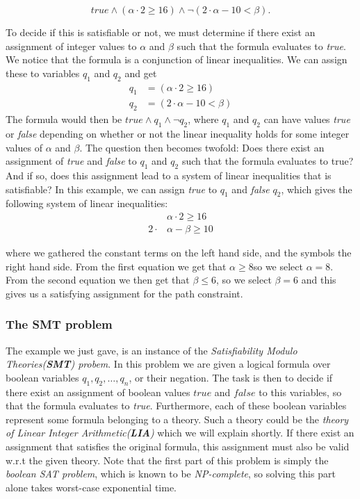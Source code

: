 	\begin{equation}	
		true \land (\alpha \cdot 2 \geq 16) \land \neg (2\cdot \alpha - 10 < \beta).
	\end{equation}
	
	To decide if this is satisfiable or not, we must determine if there exist an assignment of integer values to $\alpha$ and $\beta$ such that the formula evaluates to \emph{true}. We notice that the formula is a conjunction of linear inequalities. We can assign these to variables $q_1$ and $q_2$ and get
	\begin{align}
		q_1 & = (\alpha \cdot 2 \geq 16) \\
		q_2 & = (2\cdot \alpha - 10 < \beta)
	\end{align}
	The formula would then be $true\land q_1 \land \neg q_2$,
	where $q_1$ and $q_2$ can have values \emph{true} or \emph{false} depending on whether or not the linear inequality holds for some integer values of $\alpha$ and $\beta$. The question then becomes twofold: Does there exist an assignment of \emph{true} and \emph{false} to $q_1$ and $q_2$ such that the formula evaluates to true? And if so, does this assignment lead to a system of linear inequalities that is satisfiable?
	In this example, we can assign \emph{true} to $q_1$ and \emph{false} $q_2$, which gives the following system of linear inequalities:
	\begin{align}
		& \alpha \cdot 2 \geq 16 \\
		2  \cdot & \alpha - \beta \geq 10 
	\end{align}
	
	where we gathered the constant terms on the left hand side, and the symbols the right hand side. From the first equation we get that $\alpha \geq 8$so we select $\alpha = 8$. From the second equation we then get that $\beta \leq 6$, so we select $\beta = 6$ and this gives us a satisfying assignment for the path constraint.	
	\subsubsection{The SMT problem}
	
	The example we just gave, is an instance of the \emph{Satisfiability Modulo Theories(\textbf{SMT}) probem}. In this problem we are given a logical formula over boolean variables $q_1, q_2, \ldots, q_n$, or their negation. The task is then to decide if there exist an assignment of boolean values $true$ and $false$ to this variables, so that the formula evaluates to \emph{true}. Furthermore, each of these boolean variables represent some formula belonging to a theory. Such a theory could be the \emph{theory of Linear Integer Arithmetic(\textbf{LIA})} which we will explain shortly. If there exist an assignment that satisfies the original formula, this assignment must also be valid w.r.t the given theory. Note that the first part of this problem is simply the \emph{boolean SAT problem}, which is known to be \emph{NP-complete}, so solving this part alone takes worst-case exponential time. %
	
